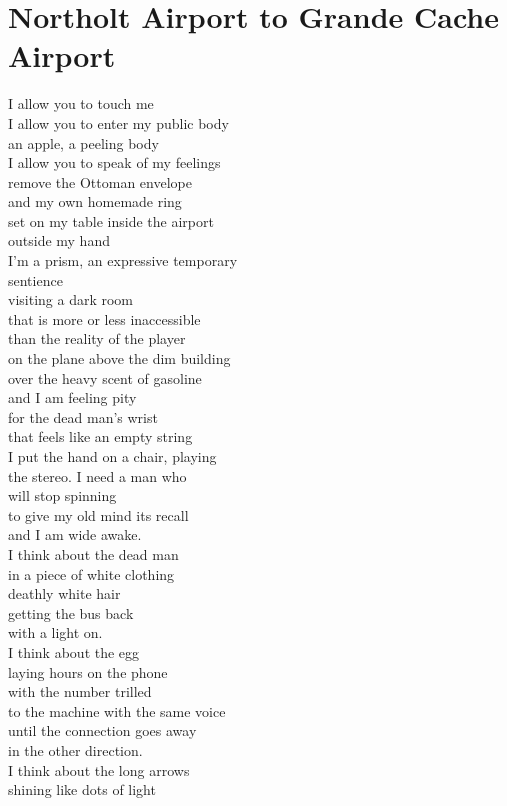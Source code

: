 \documentclass[smalldemyvopaper,11pt,twoside,onecolumn,openright,extrafontsizes]{memoir}
\begin{document}
\chapter{Northolt Airport to Grande Cache Airport}
I allow you to touch me
\\I allow you to enter my public body
\\an apple, a peeling body
\\I allow you to speak of my feelings
\\remove the Ottoman envelope
\\and my own homemade ring
\\set on my table inside the airport
\\outside my hand
\\I'm a prism, an expressive temporary
\\sentience
\\visiting a dark room
\\that is more or less inaccessible
\\than the reality of the player
\\on the plane above the dim building
\\over the heavy scent of gasoline
\\and I am feeling pity
\\for the dead man's wrist
\\that feels like an empty string
\\I put the hand on a chair, playing
\\the stereo. I need a man who
\\will stop spinning
\\to give my old mind its recall
\\and I am wide awake.
\\I think about the dead man
\\in a piece of white clothing
\\deathly white hair
\\getting the bus back
\\with a light on.
\\I think about the egg
\\laying hours on the phone
\\with the number trilled
\\to the machine with the same voice
\\until the connection goes away
\\in the other direction.
\\I think about the long arrows
\\shining like dots of light
\end{document}

